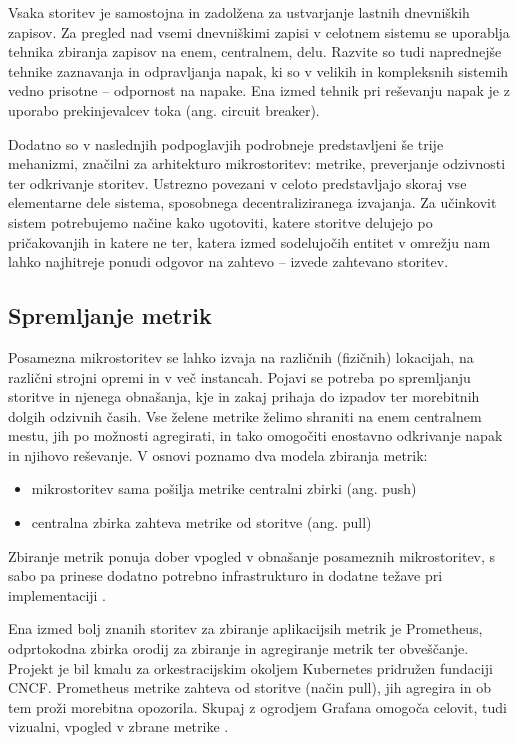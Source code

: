 \documentclass[a4paper, 12pt]{book}
\begin{document}
Vsaka storitev je samostojna in zadolžena za ustvarjanje lastnih dnevniških zapisov.
Za pregled nad vsemi dnevniškimi zapisi v celotnem sistemu se uporablja tehnika zbiranja zapisov na enem, centralnem, delu.
Razvite so tudi naprednejše tehnike zaznavanja in odpravljanja napak, ki so v velikih in kompleksnih sistemih vedno prisotne -- odpornost na napake.
Ena izmed tehnik pri reševanju napak je z uporabo prekinjevalcev toka (ang. circuit breaker)\cite{sarcMag}.

Dodatno so v naslednjih podpoglavjih podrobneje predstavljeni še trije mehanizmi, značilni za arhitekturo mikrostoritev: metrike, preverjanje odzivnosti ter odkrivanje storitev.
Ustrezno povezani v celoto predstavljajo skoraj vse elementarne dele sistema, sposobnega decentraliziranega izvajanja.
Za učinkovit sistem potrebujemo načine kako ugotoviti, katere storitve delujejo po pri\-ča\-ko\-va\-njih in katere ne ter, katera izmed sodelujočih entitet v omrežju nam lahko najhitreje ponudi odgovor na zahtevo -- izvede zahtevano storitev.

\subsection{Spremljanje metrik}

Posamezna mikrostoritev se lahko izvaja na različnih (fizičnih) lokacijah, na različni strojni opremi in v več instancah.
Pojavi se potreba po spremljanju storitve in njenega obnašanja, kje in zakaj prihaja do izpadov ter morebitnih dolgih odzivnih časih.
Vse želene metrike želimo shraniti na enem centralnem mestu, jih po možnosti agregirati, in tako omogočiti enostavno odkrivanje napak in njihovo reševanje.
V osnovi poznamo dva modela zbiranja metrik: 
\begin{itemize}
	\item mikrostoritev sama pošilja metrike centralni zbirki (ang. push)
	\item centralna zbirka zahteva metrike od storitve (ang. pull)
\end{itemize}

Zbiranje metrik ponuja dober vpogled v obnašanje posameznih mikrostoritev, s sabo pa prinese dodatno potrebno infrastrukturo in dodatne težave pri implementaciji \cite{ApplicationMetrics}.


Ena izmed bolj znanih storitev za zbiranje aplikacijsih metrik je Prometheus, odprtokodna zbirka orodij za zbiranje in agregiranje metrik ter obveščanje.
Projekt je bil kmalu za orkestracijskim okoljem Kubernetes pridružen fundaciji CNCF.
Prometheus metrike zahteva od storitve (način pull), jih agregira in ob tem proži morebitna opozorila.
Skupaj z ogrodjem Grafana omogoča celovit, tudi vizualni, vpogled v zbrane metrike \cite{Prometheus}.
\end{document}
